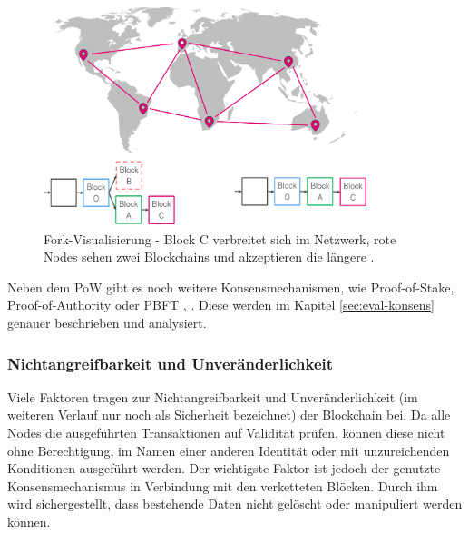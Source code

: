 \begin{figure}[!htbp]
  \centering
	\includegraphics[width=0.85\textwidth,angle=0]{images/fork_4}
 	\caption{Fork-Visualisierung - Block C verbreitet sich im Netzwerk, rote Nodes sehen zwei Blockchains und akzeptieren die längere \cite[S.~200 ff.]{AntonopoulosMasteringbitcoin2015}.}
	\label{fig:fork_4}
\end{figure}

Neben dem \acs{PoW} gibt es noch weitere Konsensmechanismen, wie Proof-of-Stake, Proof-of-Authority oder \acl{PBFT} \cite{SukhwaniPerformanceModelingPBFT2017a}, \cite{DeAngelisPBFTvsproofofauthority2017}. Diese werden im Kapitel \ref{sec:eval-konsens} genauer beschrieben und analysiert.

\subsubsection{Nichtangreifbarkeit und Unveränderlichkeit}
\label{subsec:immutability}
Viele Faktoren tragen zur Nichtangreifbarkeit und Unveränderlichkeit (im weiteren Verlauf nur noch als Sicherheit bezeichnet) der Blockchain bei. Da alle Nodes die ausgeführten Transaktionen auf Validität prüfen, können diese nicht ohne Berechtigung, im Namen einer anderen Identität oder mit unzureichenden Konditionen ausgeführt werden. Der wichtigste Faktor ist jedoch der genutzte Konsensmechanismus in Verbindung mit den verketteten Blöcken. Durch ihm wird sichergestellt, dass bestehende Daten nicht gelöscht oder manipuliert werden können.

